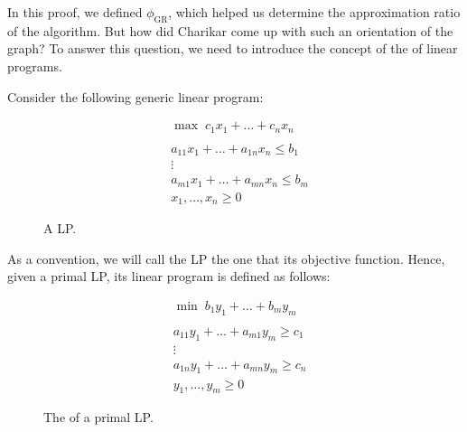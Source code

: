 \documentclass[a4paper, 12pt]{report}
\begin{document}
    In this proof, we defined $\phi_\mathrm{GR}$, which helped us determine the approximation ratio of the algorithm. But how did Charikar come up with such an orientation of the graph? To answer this question, we need to introduce the concept of the  of linear programs.

    Consider the following  generic linear program:

    \begin{figure}[H]
        \centering
        \[\begin{array}{cc}
            & \max \; c_1x_1 + \ldots + c_n x_n \\\\
            & a_{11}x_1 + \ldots + a_{1n}x_n \le b_1 \\
            & \vdots \\
            & a_{m1}x_1 + \ldots + a_{mn}x_n \le b_m \\
            & x_1, \ldots, x_n \ge 0
        \end{array}\]
        \caption{A  LP.}
    \end{figure}

    As a convention, we will call the  LP the one that  its objective function. Hence, given a primal LP, its  linear program is defined as follows:

    \begin{figure}[H]
        \centering
        \[\begin{array}{cc}
            & \min \; b_1y_1 + \ldots + b_m y_m \\\\
            & a_{11}y_1 + \ldots + a_{m1}y_m \ge c_1 \\
            & \vdots \\
            & a_{1n}y_1 + \ldots + a_{mn}y_m \ge c_n \\
            & y_1, \ldots, y_m \ge 0
        \end{array}\]
        \caption{The  of a primal LP.}
    \end{figure}
\end{document}
